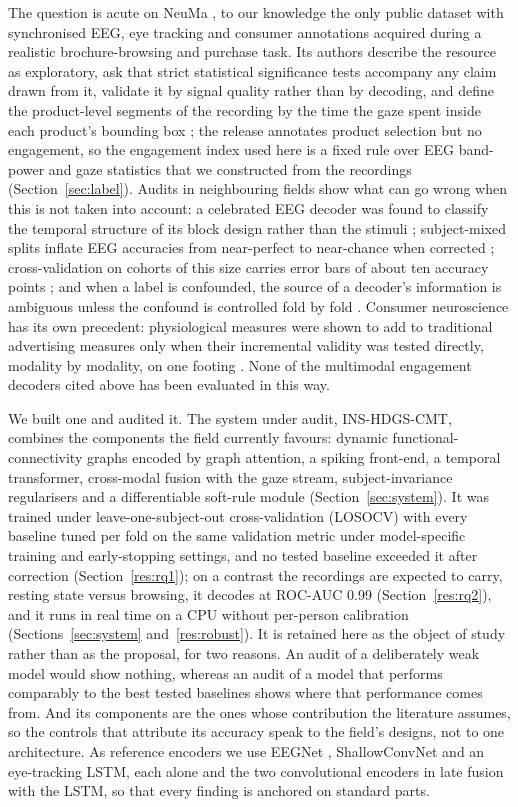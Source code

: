 The question is acute on NeuMa \cite{ref35}, to our knowledge the only public dataset with synchronised EEG, eye tracking and consumer annotations acquired during a realistic brochure-browsing and purchase task. Its authors describe the resource as exploratory, ask that strict statistical significance tests accompany any claim drawn from it, validate it by signal quality rather than by decoding, and define the product-level segments of the recording by the time the gaze spent inside each product's bounding box \cite{ref35}; the release annotates product selection but no engagement, so the engagement index used here is a fixed rule over EEG band-power and gaze statistics that we constructed from the recordings (Section~\ref{sec:label}). Audits in neighbouring fields show what can go wrong when this is not taken into account: a celebrated EEG decoder was found to classify the temporal structure of its block design rather than the stimuli \cite{ref61}; subject-mixed splits inflate EEG accuracies from near-perfect to near-chance when corrected \cite{ref62,ref28,ref29,ref30,ref31,ref32}; cross-validation on cohorts of this size carries error bars of about ten accuracy points \cite{ref63}; and when a label is confounded, the source of a decoder's information is ambiguous unless the confound is controlled fold by fold \cite{ref64}. Consumer neuroscience has its own precedent: physiological measures were shown to add to traditional advertising measures only when their incremental validity was tested directly, modality by modality, on one footing \cite{ref65}. None of the multimodal engagement decoders cited above has been evaluated in this way.

We built one and audited it. The system under audit, INS-HDGS-CMT, combines the components the field currently favours: dynamic functional-connectivity graphs encoded by graph attention, a spiking front-end, a temporal transformer, cross-modal fusion with the gaze stream, subject-invariance regularisers and a differentiable soft-rule module (Section~\ref{sec:system}). It was trained under leave-one-subject-out cross-validation (LOSOCV) with every baseline tuned per fold on the same validation metric under model-specific training and early-stopping settings, and no tested baseline exceeded it after correction (Section~\ref{res:rq1}); on a contrast the recordings are expected to carry, resting state versus browsing, it decodes at ROC-AUC 0.99 (Section~\ref{res:rq2}), and it runs in real time on a CPU without per-person calibration (Sections~\ref{sec:system} and~\ref{res:robust}). It is retained here as the object of study rather than as the proposal, for two reasons. An audit of a deliberately weak model would show nothing, whereas an audit of a model that performs comparably to the best tested baselines shows where that performance comes from. And its components are the ones whose contribution the literature assumes, so the controls that attribute its accuracy speak to the field's designs, not to one architecture. As reference encoders we use EEGNet \cite{ref50}, ShallowConvNet \cite{ref51} and an eye-tracking LSTM, each alone and the two convolutional encoders in late fusion with the LSTM, so that every finding is anchored on standard parts.

